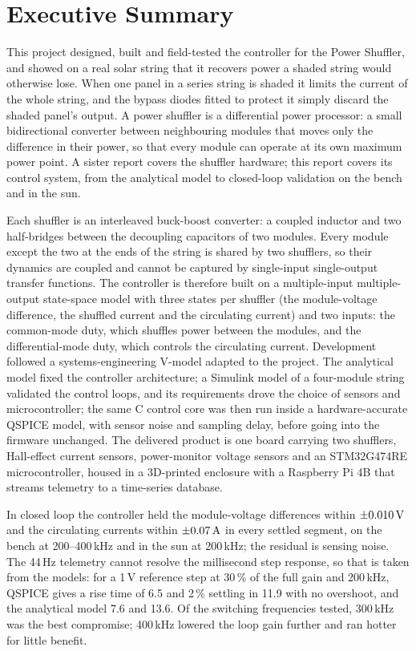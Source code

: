 \section*{Executive Summary}
\label{sec:exec}

This project designed, built and field-tested the controller for the Power Shuffler, and showed on a real solar string that it recovers power a shaded string would otherwise lose. When one panel in a series string is shaded it limits the current of the whole string, and the bypass diodes fitted to protect it simply discard the shaded panel's output. A power shuffler is a differential power processor: a small bidirectional converter between neighbouring modules that moves only the difference in their power, so that every module can operate at its own maximum power point. A sister report covers the shuffler hardware; this report covers its control system, from the analytical model to closed-loop validation on the bench and in the sun.

Each shuffler is an interleaved buck-boost converter: a coupled inductor and two half-bridges between the decoupling capacitors of two modules. Every module except the two at the ends of the string is shared by two shufflers, so their dynamics are coupled and cannot be captured by single-input single-output transfer functions. The controller is therefore built on a multiple-input multiple-output state-space model with three states per shuffler (the module-voltage difference, the shuffled current and the circulating current) and two inputs: the common-mode duty, which shuffles power between the modules, and the differential-mode duty, which controls the circulating current. Development followed a systems-engineering V-model adapted to the project. The analytical model fixed the controller architecture; a Simulink model of a four-module string validated the control loops, and its requirements drove the choice of sensors and microcontroller; the same C control core was then run inside a hardware-accurate QSPICE model, with sensor noise and sampling delay, before going into the firmware unchanged. The delivered product is one board carrying two shufflers, Hall-effect current sensors, power-monitor voltage sensors and an STM32G474RE microcontroller, housed in a 3D-printed enclosure with a Raspberry Pi 4B that streams telemetry to a time-series database.

In closed loop the controller held the module-voltage differences within $\pm0.010\,\mathrm{V}$ and the circulating currents within $\pm0.07\,\mathrm{A}$ in every settled segment, on the bench at 200--400\,kHz and in the sun at 200\,kHz; the residual is sensing noise. The 44\,Hz telemetry cannot resolve the millisecond step response, so that is taken from the models: for a 1\,V reference step at 30\,\% of the full gain and 200\,kHz, QSPICE gives a rise time of 6.5\ms{} and 2\,\% settling in 11.9\ms{} with no overshoot, and the analytical model 7.6 and 13.6\ms. Of the switching frequencies tested, 300\,kHz was the best compromise; 400\,kHz lowered the loop gain further and ran hotter for little benefit.

